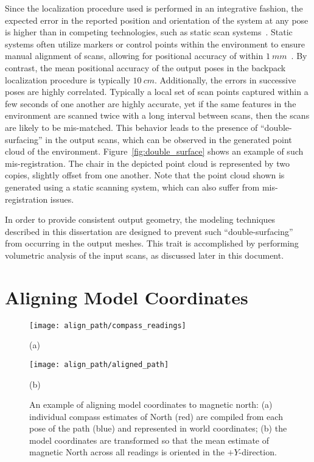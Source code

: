 \documentclass[12pt,onecolumn,oneside]{book}
\begin{document}
Since the localization procedure used is performed in an integrative fashion, the expected error in the reported position and orientation of the system at any pose is higher than in competing technologies, such as static scan systems~\cite{NickJournal}.  Static systems often utilize markers or control points within the environment to ensure manual alignment of scans, allowing for positional accuracy of within $1~mm$~\cite{Li97,Karimi00}.  By contrast, the mean positional accuracy of the output poses in the backpack localization procedure is typically $10~cm$.  Additionally, the errors in successive poses are highly correlated.  Typically a local set of scan points captured within a few seconds of one another are highly accurate, yet if the same features in the environment are scanned twice with a long interval between scans, then the scans are likely to be mis-matched.  This behavior leads to the presence of ``double-surfacing'' in the output scans, which can be observed in the generated point cloud of the environment.  Figure~\ref{fig:double_surface} shows an example of such mis-registration.  The chair in the depicted point cloud is represented by two copies, slightly offset from one another.  Note that the point cloud shown is generated using a static scanning system, which can also suffer from mis-registration issues.

In order to provide consistent output geometry, the modeling techniques described in this dissertation are designed to prevent such ``double-surfacing'' from occurring in the output meshes.  This trait is accomplished by performing volumetric analysis of the input scans, as discussed later in this document. 

\section{Aligning Model Coordinates}
\label{sec:align_path}

\begin{figure}
	\begin{minipage}[t]{0.5\linewidth}
		\centerline{\texttt{[image: align\_path/compass\_readings]}}
		\centerline{(a)}
	\end{minipage}
	\hfill
	\begin{minipage}[t]{0.5\linewidth}
		\centerline{\texttt{[image: align\_path/aligned\_path]}}
		\centerline{(b)}
	\end{minipage}

	\caption[Aligning model coordinate system with North.]{An example of aligning model coordinates to magnetic north:  (a) individual compass estimates of North (red) are compiled from each pose of the path (blue) and represented in world coordinates; (b) the model coordinates are transformed so that the mean estimate of magnetic North across all readings is oriented in the $+Y$-direction.}
	\label{fig:align_path}
\end{figure}
\end{document}
